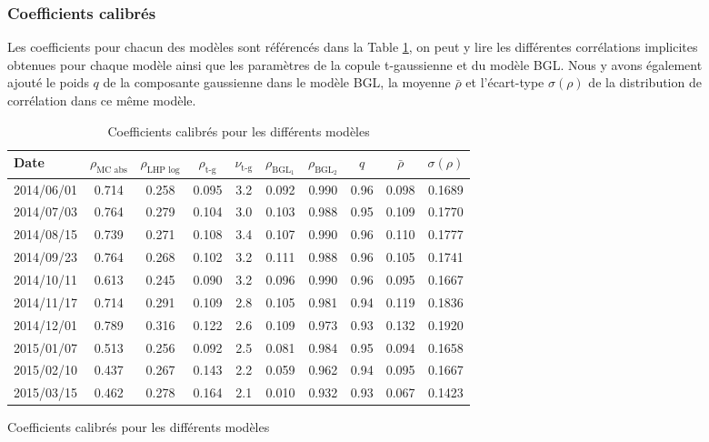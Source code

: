 \begin{figure}[H]
\subsubsection{Coefficients calibrés}

Les coefficients pour chacun des modèles sont référencés dans la Table \ref{tab:calibrated_parameters},
on peut y lire les différentes corrélations implicites obtenues pour chaque modèle ainsi que les 
paramètres de la copule t-gaussienne et du modèle BGL. Nous y avons également ajouté le poids $q$ de la 
composante gaussienne dans le modèle BGL, la moyenne $\bar{\rho}$ et l'écart-type $\sigma(\rho)$ de la 
distribution de corrélation dans ce même modèle.

\begin{table}[H]
\centering
\begin{tabular}{lccccccccc}
\toprule
Date & $\rho_{\text{MC abs}}$ & $\rho_{\text{LHP log}}$ & $\rho_{\text{t-g}}$ & $\nu_{\text{t-g}}$ & $\rho_{\text{BGL}_1}$ & $\rho_{\text{BGL}_2}$ & $q$ & $\bar{\rho}$ & $\sigma(\rho)$ \\
\midrule
2014/06/01 & 0.714 & 0.258 & 0.095 & 3.2 & 0.092 & 0.990 & 0.96 & 0.098 & 0.1689 \\
2014/07/03 & 0.764 & 0.279 & 0.104 & 3.0 & 0.103 & 0.988 & 0.95 & 0.109 & 0.1770 \\
2014/08/15 & 0.739 & 0.271 & 0.108 & 3.4 & 0.107 & 0.990 & 0.96 & 0.110 & 0.1777 \\
2014/09/23 & 0.764 & 0.268 & 0.102 & 3.2 & 0.111 & 0.988 & 0.96 & 0.105 & 0.1741 \\
2014/10/11 & 0.613 & 0.245 & 0.090 & 3.2 & 0.096 & 0.990 & 0.96 & 0.095 & 0.1667 \\
2014/11/17 & 0.714 & 0.291 & 0.109 & 2.8 & 0.105 & 0.981 & 0.94 & 0.119 & 0.1836 \\
2014/12/01 & 0.789 & 0.316 & 0.122 & 2.6 & 0.109 & 0.973 & 0.93 & 0.132 & 0.1920 \\
2015/01/07 & 0.513 & 0.256 & 0.092 & 2.5 & 0.081 & 0.984 & 0.95 & 0.094 & 0.1658 \\
2015/02/10 & 0.437 & 0.267 & 0.143 & 2.2 & 0.059 & 0.962 & 0.94 & 0.095 & 0.1667 \\
2015/03/15 & 0.462 & 0.278 & 0.164 & 2.1 & 0.010 & 0.932 & 0.93 & 0.067 & 0.1423 \\
\bottomrule
\end{tabular}
\caption{Coefficients calibrés pour les différents modèles}
\label{tab:calibrated_parameters}
\end{table}





\end{figure}

